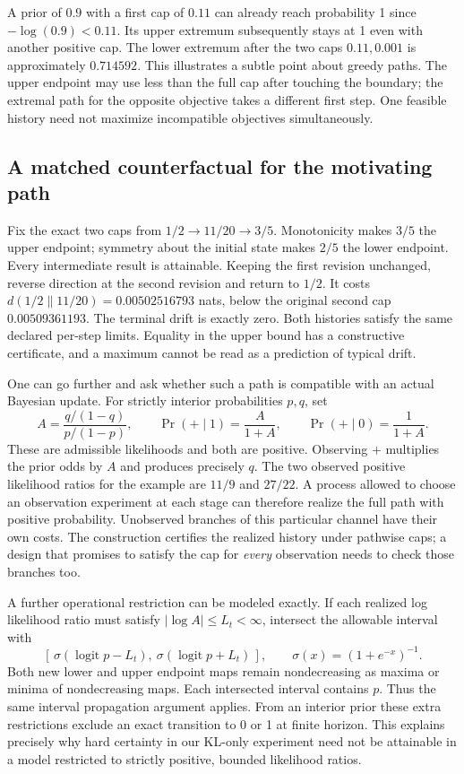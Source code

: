 \documentclass[12pt,letterpaper]{article}
\begin{document}
A prior of \(0.9\) with a first cap of \(0.11\) can already reach probability 1 since \(-\log(0.9)<0.11\). Its upper extremum subsequently stays at 1 even with another positive cap. The lower extremum after the two caps \(0.11,0.001\) is approximately \(0.714592\). This illustrates a subtle point about greedy paths. The upper endpoint may use less than the full cap after touching the boundary; the extremal path for the opposite objective takes a different first step. One feasible history need not maximize incompatible objectives simultaneously.

\subsection{A matched counterfactual for the motivating path}
Fix the exact two caps from \(1/2\to11/20\to3/5\). Monotonicity makes \(3/5\) the upper endpoint; symmetry about the initial state makes \(2/5\) the lower endpoint. Every intermediate result is attainable. Keeping the first revision unchanged, reverse direction at the second revision and return to \(1/2\). It costs \(d(1/2\|11/20)=0.00502516793\) nats, below the original second cap \(0.00509361193\). The terminal drift is exactly zero. Both histories satisfy the same declared per-step limits. Equality in the upper bound has a constructive certificate, and a maximum cannot be read as a prediction of typical drift.

One can go further and ask whether such a path is compatible with an actual Bayesian update. For strictly interior probabilities \(p,q\), set
\[
 A=\frac{q/(1-q)}{p/(1-p)},\qquad
 \Pr(+\mid1)=\frac{A}{1+A},\qquad
 \Pr(+\mid0)=\frac{1}{1+A}.
\]
These are admissible likelihoods and both are positive. Observing \(+\) multiplies the prior odds by \(A\) and produces precisely \(q\). The two observed positive likelihood ratios for the example are \(11/9\) and \(27/22\). A process allowed to choose an observation experiment at each stage can therefore realize the full path with positive probability. Unobserved branches of this particular channel have their own costs. The construction certifies the realized history under pathwise caps; a design that promises to satisfy the cap for \emph{every} observation needs to check those branches too.

A further operational restriction can be modeled exactly. If each realized log likelihood ratio must satisfy \(|\log A|\le L_t<\infty\), intersect the allowable interval with
\[
 [\,\sigma(\operatorname{logit}p-L_t),\
       \sigma(\operatorname{logit}p+L_t)\,],\qquad
 \sigma(x)=(1+e^{-x})^{-1}.
\]
Both new lower and upper endpoint maps remain nondecreasing as maxima or minima of nondecreasing maps. Each intersected interval contains \(p\). Thus the same interval propagation argument applies. From an interior prior these extra restrictions exclude an exact transition to 0 or 1 at finite horizon. This explains precisely why hard certainty in our KL-only experiment need not be attainable in a model restricted to strictly positive, bounded likelihood ratios.
\end{document}
